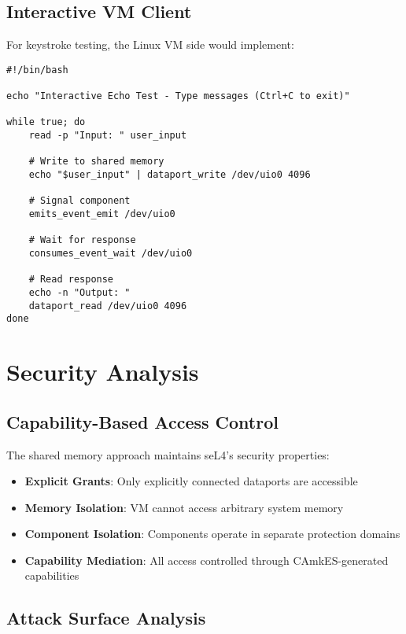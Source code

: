 \documentclass[12pt,a4paper]{article}
\begin{document}
\subsection{Interactive VM Client}

For keystroke testing, the Linux VM side would implement:

\begin{lstlisting}[style=bash, caption=Interactive echo client concept]
#!/bin/bash

echo "Interactive Echo Test - Type messages (Ctrl+C to exit)"

while true; do
    read -p "Input: " user_input
    
    # Write to shared memory
    echo "$user_input" | dataport_write /dev/uio0 4096
    
    # Signal component
    emits_event_emit /dev/uio0
    
    # Wait for response
    consumes_event_wait /dev/uio0
    
    # Read response
    echo -n "Output: "
    dataport_read /dev/uio0 4096
done
\end{lstlisting}

\section{Security Analysis}

\subsection{Capability-Based Access Control}

The shared memory approach maintains seL4's security properties:

\begin{itemize}
\item \textbf{Explicit Grants}: Only explicitly connected dataports are accessible
\item \textbf{Memory Isolation}: VM cannot access arbitrary system memory
\item \textbf{Component Isolation}: Components operate in separate protection domains
\item \textbf{Capability Mediation}: All access controlled through CAmkES-generated capabilities
\end{itemize}

\subsection{Attack Surface Analysis}
\end{document}
